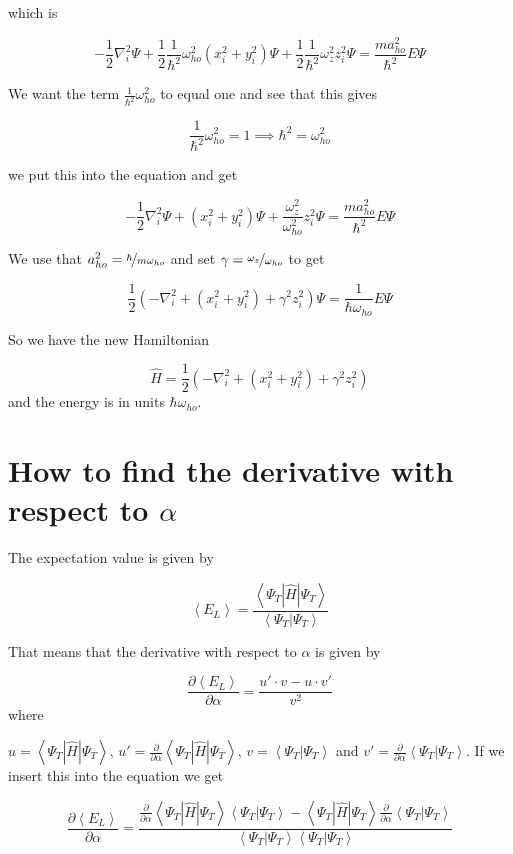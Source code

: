 which is

$$-\frac{1}{2} \nabla_i^2 \Psi + \frac{1}{2}\frac{1}{\hbar^2}\omega_{ho}^2 \left( x_i^2 + y_i^2\right)\Psi + \frac{1}{2}\frac{1}{\hbar^2}\omega_z^2 z_i^2\Psi = \frac{ma_{ho}^2}{\hbar^2}E \Psi $$

We want the term $\frac{1}{\hbar^2} \omega_{ho}^2 $ to equal one and see that this gives

$$\frac{1}{\hbar^2} \omega_{ho}^2 = 1 \implies \hbar^2 = \omega_{ho}^2$$

we put this into the equation and get

$$-\frac{1}{2} \nabla_i^2 \Psi + \left( x_i^2 + y_i^2\right)\Psi + \frac{\omega_{z}^2}{\omega_{ho}^2} z_i^2\Psi = \frac{ma_{ho}^2}{\hbar^2} E \Psi $$

We use that $a_{ho}^2 = \nicefrac{\hbar}{m\omega_{ho}}$ and set $\gamma = \nicefrac{\omega_{z}}{\omega_{ho}}$ to get

$$\frac{1}{2} \left(-\nabla_i^2 + \left( x_i^2 + y_i^2\right) + \gamma^2 z_i^2 \right)\Psi= \frac{1}{\hbar\omega_{ho}} E \Psi $$

So we have the new Hamiltonian

$$ \hat{H} = \frac{1}{2} \left(-\nabla_i^2 + \left( x_i^2 + y_i^2\right) + \gamma^2 z_i^2 \right)$$
 and the energy is in units $\hbar \omega_{ho}$.

\section{How to find the derivative with respect to $\alpha$}\label{app:alpha_derivative}

The expectation value is given by

$$ \left< E_L \right> = \frac{\left< \Psi_T | \hat{H}|\Psi_T\right>}{\left<\Psi_T|\Psi_T\right>} $$

That means that the derivative with respect to $\alpha$ is given by

$$\frac{\partial \left< E_L \right>}{\partial \alpha} = \frac{u'\cdot v - u\cdot v' }{v^2} $$ where

$ u = \left< \Psi_T | \hat{H}|\Psi_T\right>$, $u' = \frac{\partial}{\partial \alpha}\left<\Psi_T | \hat{H}|\Psi_T\right>$, $ v= \left<\Psi_T|\Psi_T\right>$ and $v' = \frac{\partial}{\partial \alpha}\left<\Psi_T|\Psi_T\right>$. If we insert this into the equation we get

$$\frac{\partial \left< E_L \right>}{\partial \alpha} = \frac{\frac{\partial}{\partial \alpha}\left<\Psi_T | \hat{H}|\Psi_T\right>\left<\Psi_T|\Psi_T\right> - \left< \Psi_T | \hat{H}|\Psi_T\right> \frac{\partial}{\partial \alpha}\left<\Psi_T|\Psi_T\right> }{\left<\Psi_T|\Psi_T\right>\left<\Psi_T|\Psi_T\right>}  $$ 

